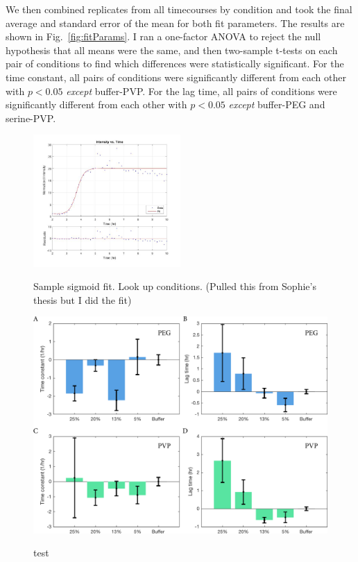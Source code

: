 We then combined replicates from all timecourses by condition and took the final average and standard error of the mean for both fit parameters.  The results are shown in Fig.~\ref{fig:fitParams}.  I ran a one-factor ANOVA to reject the null hypothesis that all means were the same, and then two-sample t-tests on each pair of conditions to find which differences were statistically significant.  For the time constant, all pairs of conditions were significantly different from each other with $p < 0.05$ \emph{except} buffer-PVP.   For the lag time, all pairs of conditions were significantly different from each other with $p < 0.05$ \emph{except} buffer-PEG and serine-PVP.

\begin{figure}
\caption{Sample sigmoid fit. Look up conditions.  (Pulled this from Sophie's thesis but I did the fit)}
\centering
\includegraphics[width=0.5\textwidth]{figs/ch05/sigmoid-fit}
\label{fig:sigmoid-fit}
\end{figure}

\begin{figure}
\caption{test}
\centering
\includegraphics[width=\textwidth]{figs/ch05/peg-and-pvp-charts}
\label{fig:peg-pvp}
\end{figure}

